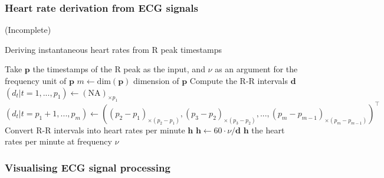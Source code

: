 \documentclass[
]{article}
\begin{document}
\hypertarget{heart-rate-derivation-from-ecg-signals}{%
\subsubsection{Heart rate derivation from ECG
signals}\label{heart-rate-derivation-from-ecg-signals}}

(Incomplete)

\begin{algorithm}
\caption{Deriving instantaneous heart rates from R peak timestamps}
\begin{algorithmic}[1]
\STATE Take $\mathbf{p}$ the timestamps of the R peak as the input, and $\nu$ as an argument for the frequency unit of $\mathbf{p}$
\STATE $m \leftarrow \text{dim}(\mathbf{p})$ dimension of $\mathbf{p}$
\STATE Compute the R-R intervals $\mathbf{d}$
\STATE $(d_t | t = 1, ..., p_1) \leftarrow (\text{NA})_{\times p_1}$
\STATE $(d_t | t = p_1 + 1, ..., p_{m}) \leftarrow ((p_2 - p_1)_{\times (p_2 - p_1)}, (p_3 - p_2)_{\times (p_3 - p_2)}, ..., (p_{m} - p_{m - 1})_{\times (p_{m} - p_{m - 1})})^\top$
\STATE Convert R-R intervals into heart rates per minute $\mathbf{h}$
\STATE $\mathbf{h} \leftarrow 60 \cdot \nu / \mathbf{d}$
\RETURN $\mathbf{h}$ the heart rates per minute at frequency $\nu$
\end{algorithmic}
\end{algorithm}

\hypertarget{visual}{%
\subsubsection{Visualising ECG signal processing}\label{visual}}
\end{document}
